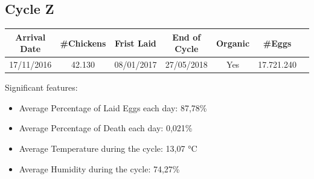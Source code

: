 \documentclass[11pt]{article}
\begin{document}
\subsection{Cycle Z}
\begin{center}
    \begin{tabular}{| c | c | c | c | c | c | c |}
        \hline
        \textbf{Arrival Date} & \textbf{\#Chickens} & \textbf{Frist Laid} & \textbf{End of Cycle} & \textbf{Organic} & \textbf{\#Eggs}     \\ [0.5ex]
        \hline
        17/11/2016   & 42.130     & 08/01/2017 & 27/05/2018   & Yes     & 17.721.240 \\
        \hline
    \end{tabular}
\end{center}

Significant features:
\begin{itemize}
    \item Average Percentage of Laid Eggs each day: 87,78\%
    \item Average Percentage of Death each day: 0,021\%
    \item Average Temperature during the cycle: 13,07 °C
    \item Average Humidity during the cycle: 74,27\%
\end{itemize}
\end{document}
